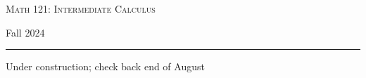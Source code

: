 \documentclass[12pt]{article}
\begin{document}
\begin{center}
{\Large \textsc{Math 121: Intermediate Calculus}}
\end{center}
\begin{center}
  Fall 2024
\end{center}

\hrule \smallskip

Under construction; check back end of August

                                             










\end{document}
